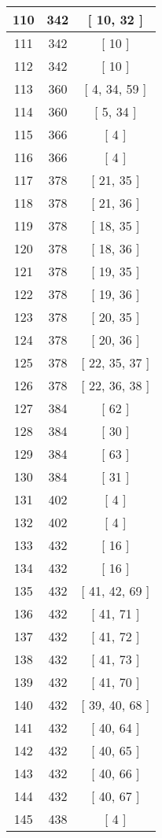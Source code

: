 \begin{center}
\begin{longtable}[H]{|| c c c ||}
\hline
110 & 342 & [ 10, 32 ] \\ 
\hline
111 & 342 & [ 10 ] \\ 
\hline
112 & 342 & [ 10 ] \\ 
\hline
113 & 360 & [ 4, 34, 59 ] \\ 
\hline
114 & 360 & [ 5, 34 ] \\ 
\hline
115 & 366 & [ 4 ] \\ 
\hline
116 & 366 & [ 4 ] \\ 
\hline
117 & 378 & [ 21, 35 ] \\ 
\hline
118 & 378 & [ 21, 36 ] \\ 
\hline
119 & 378 & [ 18, 35 ] \\ 
\hline
120 & 378 & [ 18, 36 ] \\ 
\hline
121 & 378 & [ 19, 35 ] \\ 
\hline
122 & 378 & [ 19, 36 ] \\ 
\hline
123 & 378 & [ 20, 35 ] \\ 
\hline
124 & 378 & [ 20, 36 ] \\ 
\hline
125 & 378 & [ 22, 35, 37 ] \\ 
\hline
126 & 378 & [ 22, 36, 38 ] \\ 
\hline
127 & 384 & [ 62 ] \\ 
\hline
128 & 384 & [ 30 ] \\ 
\hline
129 & 384 & [ 63 ] \\ 
\hline
130 & 384 & [ 31 ] \\ 
\hline
131 & 402 & [ 4 ] \\ 
\hline
132 & 402 & [ 4 ] \\ 
\hline
133 & 432 & [ 16 ] \\ 
\hline
134 & 432 & [ 16 ] \\ 
\hline
135 & 432 & [ 41, 42, 69 ] \\ 
\hline
136 & 432 & [ 41, 71 ] \\ 
\hline
137 & 432 & [ 41, 72 ] \\ 
\hline
138 & 432 & [ 41, 73 ] \\ 
\hline
139 & 432 & [ 41, 70 ] \\ 
\hline
140 & 432 & [ 39, 40, 68 ] \\ 
\hline
141 & 432 & [ 40, 64 ] \\ 
\hline
142 & 432 & [ 40, 65 ] \\ 
\hline
143 & 432 & [ 40, 66 ] \\ 
\hline
144 & 432 & [ 40, 67 ] \\ 
\hline
145 & 438 & [ 4 ] \\ 

\end{longtable}
\end{center}
